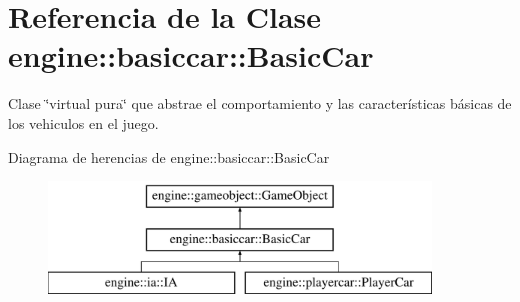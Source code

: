 \hypertarget{classengine_1_1basiccar_1_1BasicCar}{
\section{\-Referencia de la \-Clase engine\-:\-:basiccar\-:\-:\-Basic\-Car}
\label{classengine_1_1basiccar_1_1BasicCar}
}


\-Clase \char`\"{}virtual pura\char`\"{} que abstrae el comportamiento y las características básicas de los vehiculos en el juego.  


\-Diagrama de herencias de engine\-:\-:basiccar\-:\-:\-Basic\-Car\begin{figure}[H]
\begin{center}
\leavevmode
\includegraphics[height=3.000000cm]{classengine_1_1basiccar_1_1BasicCar}
\end{center}
\end{figure}
